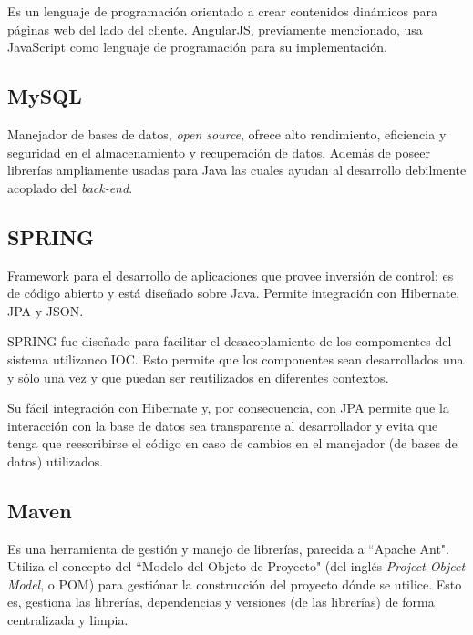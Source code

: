         Es un lenguaje de programación orientado a crear contenidos dinámicos para páginas web del lado del cliente. AngularJS, previamente mencionado, usa JavaScript como lenguaje de programación para su implementación.
        
        \subsection{MySQL}
        \label{tecno-mysql}
        
        Manejador de bases de datos, \textit{open source}, ofrece alto rendimiento, eficiencia y seguridad en el almacenamiento y recuperación de datos\cite{MYSQL-oracle}. Además de poseer librerías ampliamente usadas para Java las cuales ayudan al desarrollo debilmente acoplado del \textit{back-end}.
        
        \subsection{SPRING}
        \label{tecno-spring}
        
        Framework para el desarrollo de aplicaciones que provee inversión de control; es de código abierto y está diseñado sobre Java. Permite integración con Hibernate, JPA y JSON\cite{SPRING-essential}.
        
        SPRING fue diseñado para facilitar el desacoplamiento de los compomentes del sistema utilizanco IOC. Esto permite que los componentes sean desarrollados una y sólo una vez y que puedan ser reutilizados en diferentes contextos\cite{SPRING-referencedoc}.
        
        Su fácil integración con Hibernate y, por consecuencia, con JPA permite que la interacción con la base de datos sea transparente al desarrollador y evita que tenga que reescribirse el código en caso de cambios en el manejador (de bases de datos) utilizados.
        
        
        \subsection{Maven}
        \label{tecno-maven}
        
        Es una herramienta de gestión y manejo de librerías, parecida a ``Apache Ant". Utiliza el concepto del ``Modelo del Objeto de Proyecto" (del inglés \textit{Project Object Model}, o POM) para gestiónar la construcción del proyecto dónde se utilice. Esto es, gestiona las librerías, dependencias y versiones (de las librerías) de forma centralizada y limpia.
        
